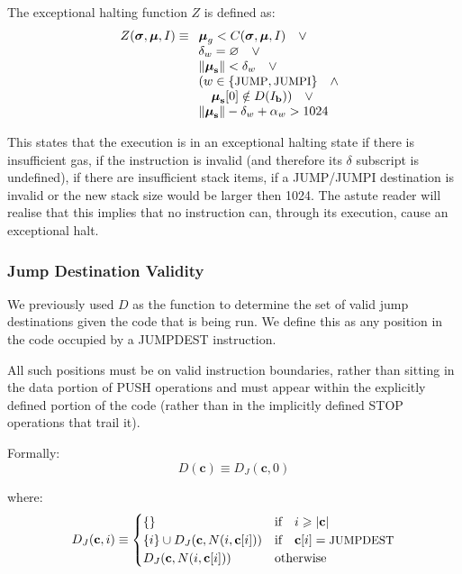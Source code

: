 \documentclass[9pt,oneside]{amsart}
\begin{document}
\begin{multicols}{2}
The exceptional halting function $Z$ is defined as:
\begin{equation}
Z(\boldsymbol{\sigma}, \boldsymbol{\mu}, I) \equiv
\begin{array}[t]{l}
\boldsymbol{\mu}_g < C(\boldsymbol{\sigma}, \boldsymbol{\mu}, I) \quad \vee \\
\mathbf{\delta}_w = \varnothing \quad \vee \\
\lVert\boldsymbol{\mu}_\mathbf{s}\rVert < \mathbf{\delta}_w \quad \vee \\
( w \in \{ \text{\small JUMP}, \text{\small JUMPI} \} \quad \wedge \\ \quad \boldsymbol{\mu}_\mathbf{s}[0] \notin D(I_\mathbf{b}) ) \quad \vee \\
\lVert\boldsymbol{\mu}_\mathbf{s}\rVert - \mathbf{\delta}_w + \mathbf{\alpha}_w > 1024 \quad
\end{array}
\end{equation}

This states that the execution is in an exceptional halting state if there is insufficient gas, if the instruction is invalid (and therefore its $\delta$ subscript is undefined), if there are insufficient stack items, if a {\small JUMP}/{\small JUMPI} destination is invalid or the new stack size would be larger then 1024. The astute reader will realise that this implies that no instruction can, through its execution, cause an exceptional halt.

\subsubsection{Jump Destination Validity}

We previously used $D$ as the function to determine the set of valid jump destinations given the code that is being run. We define this as any position in the code occupied by a {\small JUMPDEST} instruction.

All such positions must be on valid instruction boundaries, rather than sitting in the data portion of {\small PUSH} operations and must appear within the explicitly defined portion of the code (rather than in the implicitly defined {\small STOP} operations that trail it).

Formally:
\begin{equation}
D(\mathbf{c}) \equiv D_J(\mathbf{c}, 0)
\end{equation}

where:
\begin{equation}
D_J(\mathbf{c}, i) \equiv \begin{cases}
\{\} & \text{if} \quad i \geqslant |\mathbf{c}|  \\
\{ i \} \cup D_J(\mathbf{c}, N(i, \mathbf{c}[i])) & \text{if} \quad \mathbf{c}[i] = \text{\small JUMPDEST} \\
D_J(\mathbf{c}, N(i, \mathbf{c}[i])) & \text{otherwise} \\
\end{cases}
\end{equation}


\end{multicols}
\end{document}
